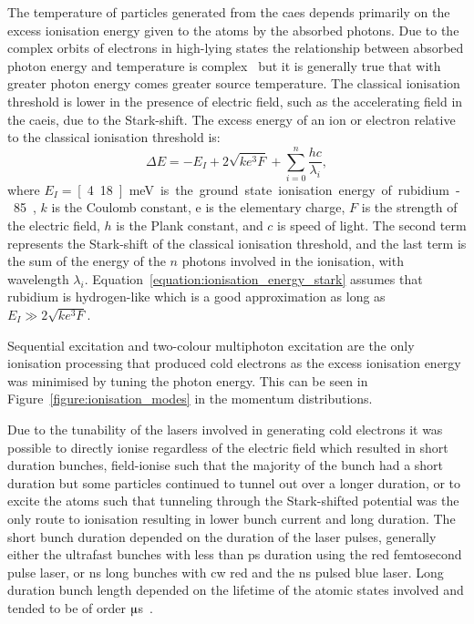 The temperature of particles generated from the \gls{caes} depends primarily on the excess ionisation energy given to the atoms by the absorbed photons.
Due to the complex orbits of electrons in high-lying states the relationship between absorbed photon energy and temperature is complex~\cite{mcculloch_high-coherence_2013} but it is generally true that with greater photon energy comes greater source temperature.
The classical ionisation threshold is lower in the presence of electric field, such as the accelerating field in the \gls{caeis}, due to the Stark-shift.
The excess energy of an ion or electron relative to the classical ionisation threshold is:
\begin{equation}\label{equation:ionisation_energy_stark}
\Delta E = -E_I + 2\sqrt{ke^3F} + \sum_{i=0}^{n}{\frac{hc}{\lambda_i}},
\end{equation}
where $E_I=$\,\unit[4.18]{meV} is the ground state ionisation energy of rubidium-85, $k$ is the Coulomb constant, e is the elementary charge, $F$ is the strength of the electric field, $h$ is the Plank constant, and $c$ is speed of light.
The second term represents the Stark-shift of the classical ionisation threshold, and the last term is the sum of the energy of the $n$ photons involved in the ionisation, with wavelength $\lambda_i$.
Equation~\ref{equation:ionisation_energy_stark} assumes that rubidium is hydrogen-like which is a good approximation as long as $E_I \gg 2\sqrt{ke^3F}$.

Sequential excitation and two-colour multiphoton excitation are the only ionisation processing that produced cold electrons as the excess ionisation energy was minimised by tuning the photon energy.
This can be seen in Figure~\ref{figure:ionisation_modes} in the momentum distributions.

Due to the tunability of the lasers involved in generating cold electrons it was possible to directly ionise regardless of the electric field which resulted in short duration bunches, field-ionise such that the majority of the bunch had a short duration but some particles continued to tunnel out over a longer duration, or to excite the atoms such that tunneling through the Stark-shifted potential was the only route to ionisation resulting in lower bunch current and long duration.
The short bunch duration depended on the duration of the laser pulses, generally either the ultrafast bunches with less than \unit[320]{ps} duration using the red femtosecond pulse laser, or \unit[5]{ns} long bunches with \gls{cw} red and the \unit[5]{ns} pulsed blue laser.
Long duration bunch length depended on the lifetime of the atomic states involved and tended to be of order \unit[10]{$\muup$s}~\cite{speirs_identification_2017}.

